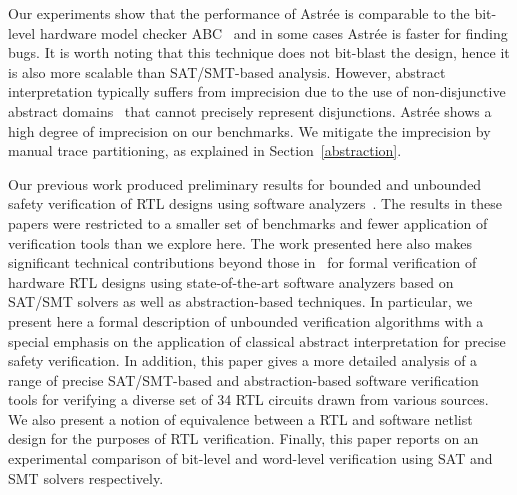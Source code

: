 Our experiments show that the performance of Astr{\'e}e is comparable to the
bit-level hardware model checker ABC~\cite{abc} and in some cases Astr{\'e}e
is faster for finding bugs.  It is worth noting that this technique does not
bit-blast the design, hence it is also more scalable than SAT/SMT-based
analysis.  However, abstract interpretation typically suffers from
imprecision due to the use of non-disjunctive abstract domains~\cite{nd}
that cannot precisely represent disjunctions.  Astr{\'e}e shows a high
degree of imprecision on our benchmarks.  We mitigate the imprecision by
manual trace partitioning, as explained in Section~\ref{abstraction}.


Our previous work produced preliminary results 
for bounded and unbounded safety verification of RTL designs using 
software analyzers~\cite{mkm2015,mskm2016}.  
The results in these papers were restricted to a smaller set 
of benchmarks and fewer application of verification tools than we
explore here.  
The work presented here also makes significant technical contributions 
beyond those in~\cite{mkm2015,mskm2016} for formal 
verification of hardware RTL designs using state-of-the-art software analyzers 
based on SAT/SMT solvers as well as abstraction-based techniques. 
In particular, we present here a formal description of unbounded 
verification algorithms with a special emphasis on the application of  
classical abstract interpretation for precise safety verification.  In addition, 
this paper gives a more detailed analysis of a range of precise SAT/SMT-based 
and abstraction-based software verification tools for verifying a diverse set of 34 RTL 
circuits drawn from various sources.  We also present a notion of 
equivalence between a RTL and software netlist design for the purposes of RTL 
verification.  Finally, this paper reports on an experimental comparison of
bit-level and word-level verification using SAT and SMT solvers respectively. 

